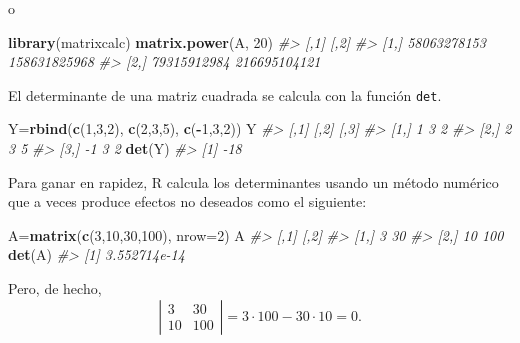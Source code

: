 \documentclass[
]{book}
\newenvironment{Shaded}{\begin{snugshade}}{\end{snugshade}}
\newcommand{\CommentTok}[1]{\textcolor[rgb]{0.56,0.35,0.01}{\textit{#1}}}
\newcommand{\DataTypeTok}[1]{\textcolor[rgb]{0.13,0.29,0.53}{#1}}
\newcommand{\DecValTok}[1]{\textcolor[rgb]{0.00,0.00,0.81}{#1}}
\newcommand{\KeywordTok}[1]{\textcolor[rgb]{0.13,0.29,0.53}{\textbf{#1}}}
\newcommand{\NormalTok}[1]{#1}
\newcommand{\OperatorTok}[1]{\textcolor[rgb]{0.81,0.36,0.00}{\textbf{#1}}}
\theoremstyle{definition}
\theoremstyle{definition}
\theoremstyle{definition}
\theoremstyle{remark}
\begin{document}
o

\begin{Shaded}
\begin{Highlighting}[]
\KeywordTok{library}\NormalTok{(matrixcalc)}
\KeywordTok{matrix.power}\NormalTok{(A, }\DecValTok{20}\NormalTok{)}
\CommentTok{\#\textgreater{}             [,1]         [,2]}
\CommentTok{\#\textgreater{} [1,] 58063278153 158631825968}
\CommentTok{\#\textgreater{} [2,] 79315912984 216695104121}
\end{Highlighting}
\end{Shaded}

El determinante de una matriz cuadrada se calcula con la función \texttt{det}.

\begin{Shaded}
\begin{Highlighting}[]
\NormalTok{Y=}\KeywordTok{rbind}\NormalTok{(}\KeywordTok{c}\NormalTok{(}\DecValTok{1}\NormalTok{,}\DecValTok{3}\NormalTok{,}\DecValTok{2}\NormalTok{), }\KeywordTok{c}\NormalTok{(}\DecValTok{2}\NormalTok{,}\DecValTok{3}\NormalTok{,}\DecValTok{5}\NormalTok{), }\KeywordTok{c}\NormalTok{(}\OperatorTok{{-}}\DecValTok{1}\NormalTok{,}\DecValTok{3}\NormalTok{,}\DecValTok{2}\NormalTok{))}
\NormalTok{Y}
\CommentTok{\#\textgreater{}      [,1] [,2] [,3]}
\CommentTok{\#\textgreater{} [1,]    1    3    2}
\CommentTok{\#\textgreater{} [2,]    2    3    5}
\CommentTok{\#\textgreater{} [3,]   {-}1    3    2}
\KeywordTok{det}\NormalTok{(Y)}
\CommentTok{\#\textgreater{} [1] {-}18}
\end{Highlighting}
\end{Shaded}

Para ganar en rapidez, R calcula los determinantes usando un método numérico que a veces produce efectos no deseados como el siguiente:

\begin{Shaded}
\begin{Highlighting}[]
\NormalTok{A=}\KeywordTok{matrix}\NormalTok{(}\KeywordTok{c}\NormalTok{(}\DecValTok{3}\NormalTok{,}\DecValTok{10}\NormalTok{,}\DecValTok{30}\NormalTok{,}\DecValTok{100}\NormalTok{), }\DataTypeTok{nrow=}\DecValTok{2}\NormalTok{)}
\NormalTok{A}
\CommentTok{\#\textgreater{}      [,1] [,2]}
\CommentTok{\#\textgreater{} [1,]    3   30}
\CommentTok{\#\textgreater{} [2,]   10  100}
\KeywordTok{det}\NormalTok{(A)}
\CommentTok{\#\textgreater{} [1] 3.552714e{-}14}
\end{Highlighting}
\end{Shaded}

Pero, de hecho,
\[
\left|\begin{array}{cc}
3 & 30\\ 10 &100
\end{array}\right|=
3\cdot 100-30\cdot 10=0.
\]
\end{document}
